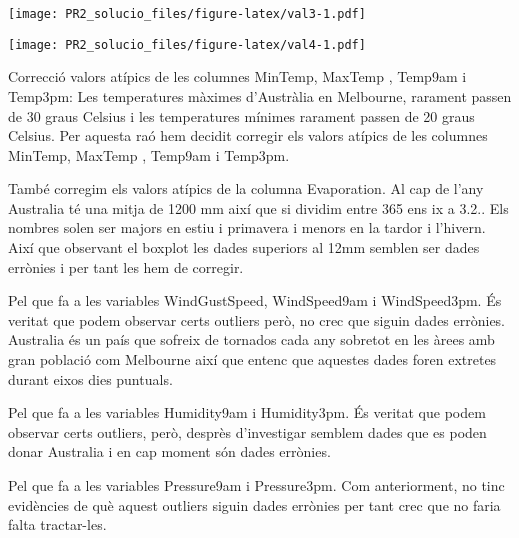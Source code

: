 \documentclass[
]{article}
\newenvironment{Shaded}{\begin{snugshade}}{\end{snugshade}}
\newcommand{\DataTypeTok}[1]{\textcolor[rgb]{0.13,0.29,0.53}{#1}}
\newcommand{\DecValTok}[1]{\textcolor[rgb]{0.00,0.00,0.81}{#1}}
\newcommand{\KeywordTok}[1]{\textcolor[rgb]{0.13,0.29,0.53}{\textbf{#1}}}
\newcommand{\NormalTok}[1]{#1}
\newcommand{\OperatorTok}[1]{\textcolor[rgb]{0.81,0.36,0.00}{\textbf{#1}}}
\newcommand{\OtherTok}[1]{\textcolor[rgb]{0.56,0.35,0.01}{#1}}
\newcommand{\StringTok}[1]{\textcolor[rgb]{0.31,0.60,0.02}{#1}}
\begin{document}
\texttt{[image: PR2\_solucio\_files/figure-latex/val3-1.pdf]}

\begin{Shaded}
\end{Shaded}

\texttt{[image: PR2\_solucio\_files/figure-latex/val4-1.pdf]}

Correcció valors atípics de les columnes MinTemp, MaxTemp , Temp9am i
Temp3pm: Les temperatures màximes d'Austràlia en Melbourne, rarament
passen de 30 graus Celsius i les temperatures mínimes rarament passen de
20 graus Celsius. Per aquesta raó hem decidit corregir els valors
atípics de les columnes MinTemp, MaxTemp , Temp9am i Temp3pm.

També corregim els valors atípics de la columna Evaporation. Al cap de
l'any Australia té una mitja de 1200 mm així que si dividim entre 365
ens ix a 3.2.. Els nombres solen ser majors en estiu i primavera i
menors en la tardor i l'hivern. Així que observant el boxplot les dades
superiors al 12mm semblen ser dades errònies i per tant les hem de
corregir.

Pel que fa a les variables WindGustSpeed, WindSpeed9am i WindSpeed3pm.
És veritat que podem observar certs outliers però, no crec que siguin
dades errònies. Australia és un país que sofreix de tornados cada any
sobretot en les àrees amb gran població com Melbourne així que entenc
que aquestes dades foren extretes durant eixos dies puntuals.

Pel que fa a les variables Humidity9am i Humidity3pm. És veritat que
podem observar certs outliers, però, desprès d'investigar semblem dades
que es poden donar Australia i en cap moment són dades errònies.

Pel que fa a les variables Pressure9am i Pressure3pm. Com anteriorment,
no tinc evidències de què aquest outliers siguin dades errònies per tant
crec que no faria falta tractar-les.
\end{document}

